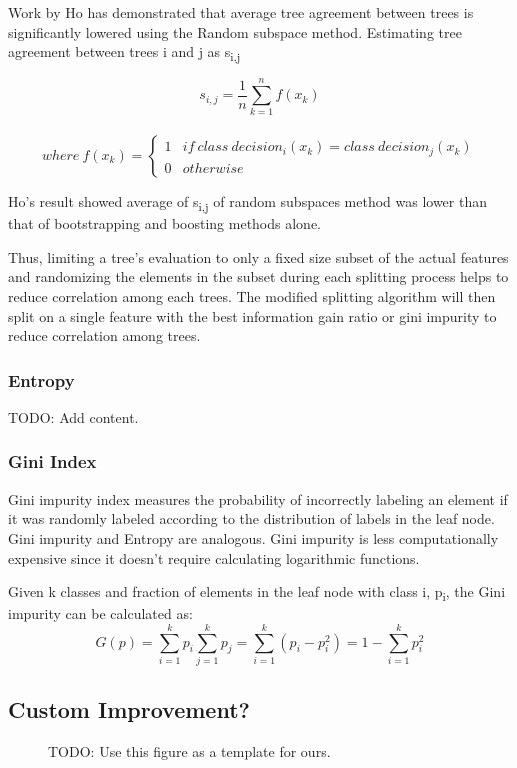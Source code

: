 \documentclass{article} %
\begin{document}
 Work by Ho has demonstrated that average tree agreement between trees is significantly lowered using the Random subspace method. \cite{Ho98}
Estimating tree agreement between trees i and j as s\textsubscript{i,j}

\[ s_{i,j} = \frac{1}{n}\sum_{k=1}^{n}f(x_k)\]
\
\[ where \ f(x_k) = \begin{cases}
      1 & if\ class\ decision_i(x_k) = class \ decision_j(x_k) \\
      0 & otherwise
   \end{cases}
\]

Ho's result showed average of s\textsubscript{i,j} of random subspaces method was lower than that of bootstrapping and boosting methods alone. \cite{Ho98}

 Thus, limiting a tree's evaluation to only a fixed size subset of the actual features and randomizing the elements in the subset during each splitting process helps to reduce correlation among each trees. The modified splitting algorithm will then split on a single feature with the best information gain ratio or gini impurity to reduce correlation among trees.

\subsubsection{Entropy}
TODO: Add content.

\subsubsection{Gini Index}
Gini impurity index measures the probability of incorrectly labeling an element if it was randomly labeled according to the distribution of labels in the leaf node. Gini impurity and Entropy are analogous. Gini impurity is less computationally expensive since it doesn't require calculating logarithmic functions.

Given k classes and fraction of elements in the leaf node with class i, p\textsubscript{i}, the Gini impurity can be calculated as:
\[G(p) = \sum_{i=1}^{k}p_i \sum_{j=1}^{k}p_j = \sum_{i=1}^{k}(p_i-p_i^2) = 1 - \sum_{i=1}^{k}p_i^2 \]

\subsection{Custom Improvement?}



\begin{figure}[h]
\begin{center}
\fbox{\rule[-.5cm]{0cm}{4cm} \rule[-.5cm]{4cm}{0cm}}
\end{center}
\caption{TODO: Use this figure as a template for ours.}
\end{figure}
\end{document}
